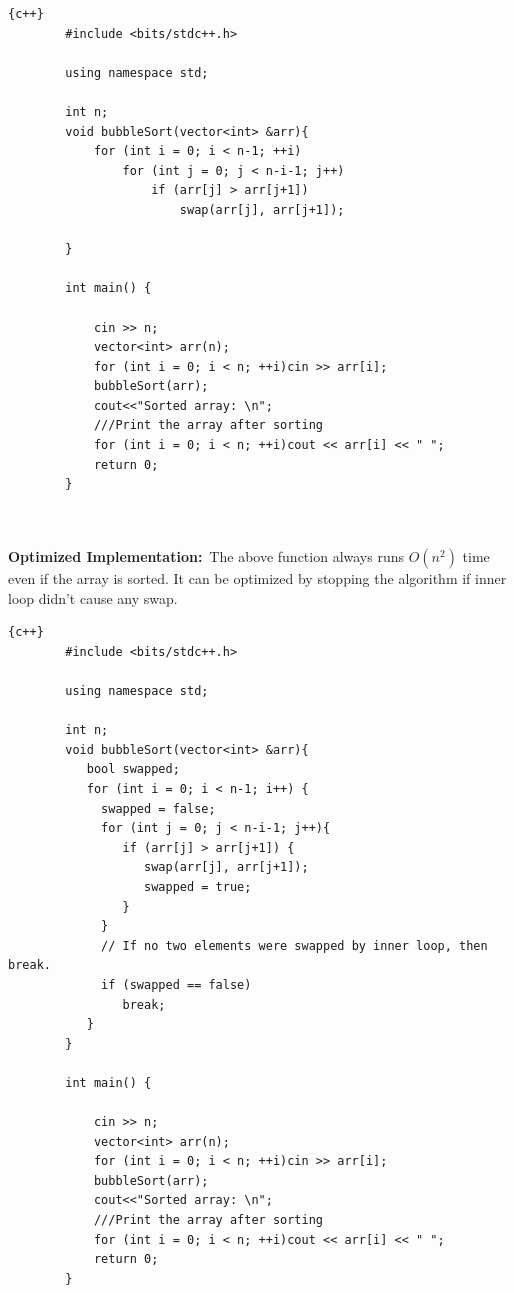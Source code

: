\begin{lstlisting}{c++}
        #include <bits/stdc++.h>
        
        using namespace std;
        
        int n;
        void bubbleSort(vector<int> &arr){
        	for (int i = 0; i < n-1; ++i)
                for (int j = 0; j < n-i-1; j++)
                    if (arr[j] > arr[j+1])
                        swap(arr[j], arr[j+1]);
        
        }
        
        int main() {
            
        	cin >> n;
        	vector<int> arr(n);
        	for (int i = 0; i < n; ++i)cin >> arr[i];
        	bubbleSort(arr);
        	cout<<"Sorted array: \n";
        	///Print the array after sorting
        	for (int i = 0; i < n; ++i)cout << arr[i] << " ";
        	return 0;
        }
\end{lstlisting}
\newline\newline\newline
\\
\\
\textbf{{\Large{Optimized Implementation:}}}\newline\newline\
The above function always runs $O(n^2)$ time even if the array is sorted. It can be optimized by stopping the algorithm if inner loop didn’t cause any swap.
\newline
\begin{lstlisting}{c++}
        #include <bits/stdc++.h>
        
        using namespace std;
        
        int n;
        void bubbleSort(vector<int> &arr){
           bool swapped;
           for (int i = 0; i < n-1; i++) {
             swapped = false;
             for (int j = 0; j < n-i-1; j++){
                if (arr[j] > arr[j+1]) {
                   swap(arr[j], arr[j+1]);
                   swapped = true;
                }
             }
             // If no two elements were swapped by inner loop, then break.
             if (swapped == false)
                break;
           }
        }
        
        int main() {
        
        	cin >> n;
        	vector<int> arr(n);
        	for (int i = 0; i < n; ++i)cin >> arr[i];
        	bubbleSort(arr);
        	cout<<"Sorted array: \n";
        	///Print the array after sorting
        	for (int i = 0; i < n; ++i)cout << arr[i] << " ";
        	return 0;
        }
\end{lstlisting}


